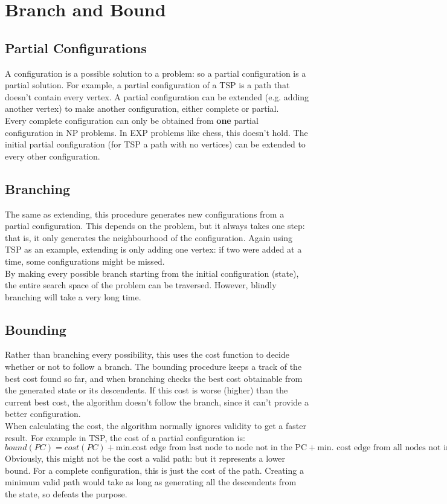 \section{Branch and Bound}

\subsection{Partial Configurations}
A configuration is a possible solution to a problem: so a partial configuration is a partial solution. For example, a partial configuration of a TSP is a path that doesn't contain every vertex. A partial configuration can be extended (e.g. adding another vertex) to make another configuration, either complete or partial.\\
Every complete configuration can only be obtained from \textbf{one} partial configuration in NP problems. In EXP problems like chess, this doesn't hold. The initial partial configuration (for TSP a path with no vertices) can be extended to every other configuration. 

\subsection{Branching}
The same as extending, this procedure generates new configurations from a partial configuration. This depends on the problem, but it always takes one step: that is, it only generates the neighbourhood of the configuration. Again using TSP as an example, extending is only adding one vertex: if two were added at a time, some configurations might be missed. \\
By making every possible branch starting from the initial configuration (state), the entire search space of the problem can be traversed. However, blindly branching will take a very long time.

\subsection{Bounding}
Rather than branching every possibility, this uses the cost function to decide whether or not to follow a branch. The bounding procedure keeps a track of the best cost found so far, and when branching checks the best cost obtainable from the generated state or its descendents. If this cost is worse (higher) than the current best cost, the algorithm doesn't follow the branch, since it can't provide a better configuration. \\
When calculating the cost, the algorithm normally ignores validity to get a faster result. For example in TSP, the cost of a partial configuration is:
\begin{equation}
    bound(PC) = cost(PC) + \text{min.cost edge from last node to node not in the PC} + \text{min. cost edge from all nodes not in the PC}
\end{equation}
Obviously, this might not be the cost a valid path: but it represents a lower bound. For a complete configuration, this is just the cost of the path. Creating a minimum valid path would take as long as generating all the descendents from the state, so defeats the purpose.

